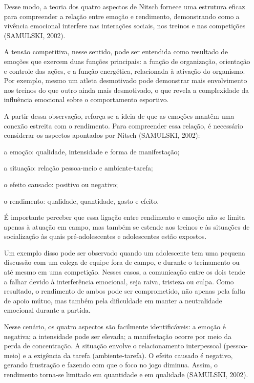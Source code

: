 \begin{Desenvolvimento}
Desse modo, a teoria dos quatro aspectos de Nitsch fornece uma estrutura eficaz para compreender a relação entre emoção e rendimento, demonstrando como a vivência emocional interfere nas interações sociais, nos treinos e nas competições (SAMULSKI, 2002).

A tensão competitiva, nesse sentido, pode ser entendida como resultado de emoções que exercem duas funções principais: a função de organização, orientação e controle das ações, e a função energética, relacionada à ativação do organismo. Por exemplo, mesmo um atleta desmotivado pode demonstrar mais envolvimento nos treinos do que outro ainda mais desmotivado, o que revela a complexidade da influência emocional sobre o comportamento esportivo.

A partir dessa observação, reforça-se a ideia de que as emoções mantêm uma conexão estreita com o rendimento. Para compreender essa relação, é necessário considerar os aspectos apontados por Nitsch (SAMULSKI, 2002):
\begin{alinea}
  \item a emoção: qualidade, intensidade e forma de manifestação;
  \item a situação: relação pessoa-meio e ambiente-tarefa;
  \item o efeito causado: positivo ou negativo;
  \item o rendimento: qualidade, quantidade, gasto e efeito.  
\end{alinea}

É importante perceber que essa ligação entre rendimento e emoção não se limita apenas à atuação em campo, mas também se estende aos treinos e às situações de socialização às quais pré-adolescentes e adolescentes estão expostos.

Um exemplo disso pode ser observado quando um adolescente tem uma pequena discussão com um colega de equipe fora de campo, e durante o treinamento ou até mesmo em uma competição. Nesses casos, a comunicação entre os dois tende a falhar devido à interferência emocional, seja raiva, tristeza ou culpa. Como resultado, o rendimento de ambos pode ser comprometido, não apenas pela falta de apoio mútuo, mas também pela dificuldade em manter a neutralidade emocional durante a partida.

Nesse cenário, os quatro aspectos são facilmente identificáveis: a emoção é negativa; a intensidade pode ser elevada; a manifestação ocorre por meio da perda de concentração. A situação envolve o relacionamento interpessoal (pessoa-meio) e a exigência da tarefa (ambiente-tarefa). O efeito causado é negativo, gerando frustração e fazendo com que o foco no jogo diminua. Assim, o rendimento torna-se limitado em quantidade e em qualidade (SAMULSKI, 2002).


\end{Desenvolvimento}
